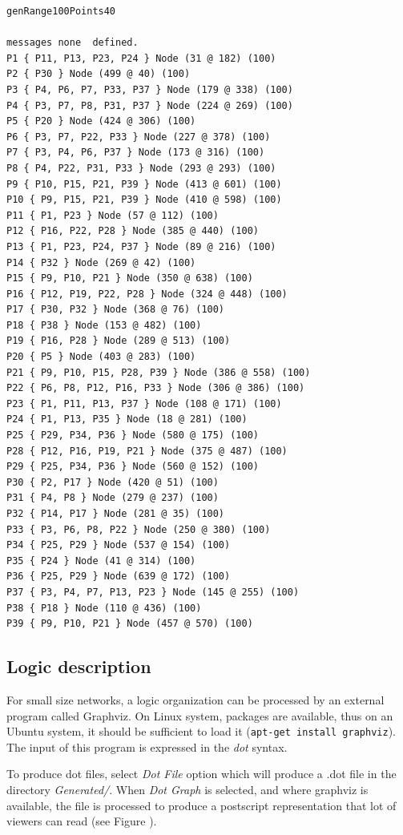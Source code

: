 \documentclass[times,a4paper]{book}
\begin{document}
\begin{lstlisting}
genRange100Points40

messages none  defined. 
P1 { P11, P13, P23, P24 } Node (31 @ 182) (100)
P2 { P30 } Node (499 @ 40) (100)
P3 { P4, P6, P7, P33, P37 } Node (179 @ 338) (100)
P4 { P3, P7, P8, P31, P37 } Node (224 @ 269) (100)
P5 { P20 } Node (424 @ 306) (100)
P6 { P3, P7, P22, P33 } Node (227 @ 378) (100)
P7 { P3, P4, P6, P37 } Node (173 @ 316) (100)
P8 { P4, P22, P31, P33 } Node (293 @ 293) (100)
P9 { P10, P15, P21, P39 } Node (413 @ 601) (100)
P10 { P9, P15, P21, P39 } Node (410 @ 598) (100)
P11 { P1, P23 } Node (57 @ 112) (100)
P12 { P16, P22, P28 } Node (385 @ 440) (100)
P13 { P1, P23, P24, P37 } Node (89 @ 216) (100)
P14 { P32 } Node (269 @ 42) (100)
P15 { P9, P10, P21 } Node (350 @ 638) (100)
P16 { P12, P19, P22, P28 } Node (324 @ 448) (100)
P17 { P30, P32 } Node (368 @ 76) (100)
P18 { P38 } Node (153 @ 482) (100)
P19 { P16, P28 } Node (289 @ 513) (100)
P20 { P5 } Node (403 @ 283) (100)
P21 { P9, P10, P15, P28, P39 } Node (386 @ 558) (100)
P22 { P6, P8, P12, P16, P33 } Node (306 @ 386) (100)
P23 { P1, P11, P13, P37 } Node (108 @ 171) (100)
P24 { P1, P13, P35 } Node (18 @ 281) (100)
P25 { P29, P34, P36 } Node (580 @ 175) (100)
P28 { P12, P16, P19, P21 } Node (375 @ 487) (100)
P29 { P25, P34, P36 } Node (560 @ 152) (100)
P30 { P2, P17 } Node (420 @ 51) (100)
P31 { P4, P8 } Node (279 @ 237) (100)
P32 { P14, P17 } Node (281 @ 35) (100)
P33 { P3, P6, P8, P22 } Node (250 @ 380) (100)
P34 { P25, P29 } Node (537 @ 154) (100)
P35 { P24 } Node (41 @ 314) (100)
P36 { P25, P29 } Node (639 @ 172) (100)
P37 { P3, P4, P7, P13, P23 } Node (145 @ 255) (100)
P38 { P18 } Node (110 @ 436) (100)
P39 { P9, P10, P21 } Node (457 @ 570) (100)
\end{lstlisting}



\subsection{Logic description}
\label{sec:logicdes}
For small size networks, a logic organization can be processed by an external program called
Graphviz. On Linux system, packages are available, thus on an Ubuntu system, it should be
sufficient to load it ({\tt apt-get install graphviz}). The input of this program is expressed 
in the {\sl dot} syntax.

To produce dot files, select {\sl Dot File} option which will produce a .dot file in the directory {\sl Generated/}.
When {\sl Dot Graph} is selected, and where graphviz is available, the file is processed to produce
a postscript representation that lot of viewers can read (see Figure \label{fig:genRange100Points40-rogne}).
 
\end{document}
